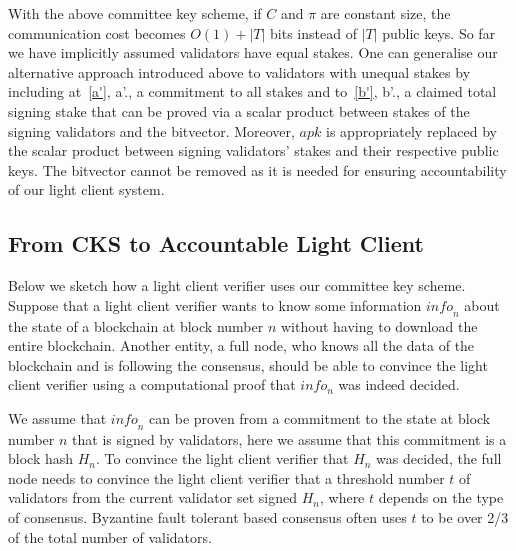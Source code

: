 \noindent With the above committee key scheme, if $C$ and $\pi$ are constant size, 
the communication cost becomes $O(1)+|T|$ bits instead of $|T|$ public keys. {\color{red} So far we have implicitly assumed validators have equal stakes. 
One can generalise our alternative approach introduced above to validators with unequal stakes by including at~\ref{a'}, a'.,  a commitment to all stakes 
and to~\ref{b'}, b'., a claimed total signing stake that can be proved via a scalar product between stakes of the signing validators and 
the bitvector. Moreover, $\mathit{apk}$ is appropriately replaced by the scalar product between signing validators' stakes and their 
respective public keys. The bitvector cannot be removed as it is needed for ensuring accountability of our light client system.}

\subsection{From CKS to Accountable Light Client}
\label{sec_intro_committee}

Below we sketch how a light client verifier uses our committee key scheme. Suppose that a light client verifier wants to know some information $\mathit{info}_n$ about the state of a blockchain at block number $n$ without having to download the entire blockchain. Another entity, a full node, who knows all the data of the blockchain and is following the consensus, should be able to convince the light client verifier using a computational proof that $info_n$ was indeed decided.

We assume that $\mathit{info}_n$ can be proven from a commitment to the state at block number $n$ that is signed by validators, here we assume that this commitment is a block hash $H_n$. To convince the light client verifier that $H_n$  was decided, the full node needs to convince the light client verifier that a threshold number $t$ of validators from the current validator set signed $H_n$, where $t$ depends on the type of consensus. Byzantine fault tolerant based consensus often uses $t$ to be over 2/3 of the total number of validators.


